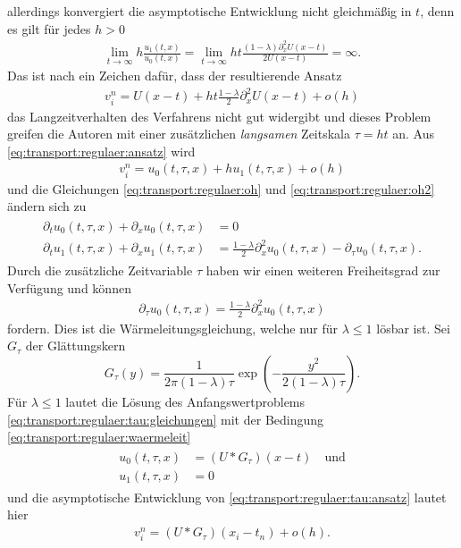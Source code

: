allerdings konvergiert die asymptotische Entwicklung nicht gleichmäßig in $t$, denn es gilt für jedes $h > 0$
\begin{align*}
\lim_{t \to \infty} h \frac{u_1(t,x)}{u_0(t,x)} = \lim_{t \to \infty} h t \frac{(1-\lambda) \partial^2_x U(x-t) }{2 U(x-t)} = \infty.
\end{align*}
Das ist nach \cite{Junk2004} ein Zeichen dafür, dass der resultierende Ansatz
\begin{align}\label{eq:transport:regulaer:ansatz:ergebnis}
v^n_i = U(x-t) + h t \frac{1-\lambda}{2} \partial^2_x U(x-t) + o(h)
\end{align}
das Langzeitverhalten des Verfahrens nicht gut widergibt und dieses Problem greifen die Autoren mit einer zusätzlichen \emph{langsamen} Zeitskala $\tau = h t$ an.
Aus \eqref{eq:transport:regulaer:ansatz} wird
\begin{align}\label{eq:transport:regulaer:tau:ansatz}
v^n_i = u_0(t, \tau, x) + h u_1(t, \tau, x) + o(h)
\end{align}
und die Gleichungen \eqref{eq:transport:regulaer:oh} und \eqref{eq:transport:regulaer:oh2} ändern sich zu
\begin{align}
\begin{split}
\label{eq:transport:regulaer:tau:gleichungen}
\partial_t u_0(t,\tau,x) + \partial_x u_0(t,\tau,x) &= 0\\
\partial_t u_1(t,\tau,x) + \partial_x u_1(t,\tau,x) &= \frac{1-\lambda}{2} \partial^2_x u_0(t,\tau,x) - \partial_\tau u_0(t,\tau,x).
\end{split}
\end{align}
Durch die zusätzliche Zeitvariable $\tau$ haben wir einen weiteren Freiheitsgrad zur Verfügung und können
\begin{align}\label{eq:transport:regulaer:waermeleit}
\partial_\tau u_0(t,\tau,x) = \frac{1-\lambda}{2} \partial^2_x u_0(t,\tau,x)
\end{align}
fordern. Dies ist die Wärmeleitungsgleichung, welche nur für $\lambda \leq 1$ lösbar ist.
Sei $G_\tau$ der Glättungskern
$$G_\tau(y) = \frac{1}{2 \pi (1-\lambda)\tau} \exp\left( - \frac{y^2}{2 (1 - \lambda) \tau} \right).$$
Für $\lambda \leq 1$ lautet die Lösung des Anfangswertproblems \eqref{eq:transport:regulaer:tau:gleichungen} mit der Bedingung \eqref{eq:transport:regulaer:waermeleit}
\begin{align}
\begin{split}
u_0(t,\tau,x) &= (U * G_\tau)(x - t) \quad \text{und}\\
u_1(t,\tau,x) &= 0
\end{split}
\end{align}
und die asymptotische Entwicklung von \eqref{eq:transport:regulaer:tau:ansatz} lautet hier
\begin{align}\label{eq:transport:regulaer:tau:ergebnis}
v^n_i = (U * G_\tau)(x_i - t_n) + o(h).
\end{align}

